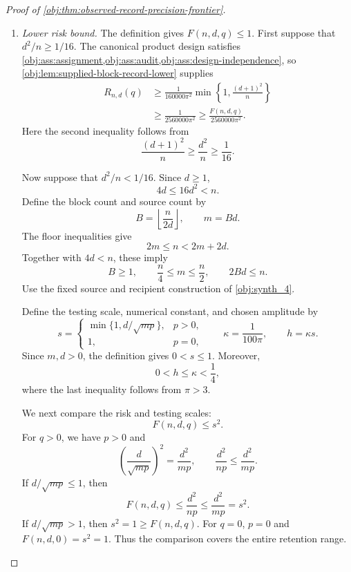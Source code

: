 \documentclass[11pt]{article}
\begin{document}
\begin{proof}[Proof of \cref{obj:thm:observed-record-precision-frontier}]
\begin{enumerate}
\item \textit{Lower risk bound.}
The definition gives \(F(n,d,q)\le1\). First suppose that
\(d^2/n\ge1/16\). The canonical product design satisfies
\cref{obj:ass:assignment,obj:ass:audit,obj:ass:design-independence}, so
\cref{obj:lem:supplied-block-record-lower} supplies
\[
\begin{aligned}
R_{n,d}(q)
&\ge\frac{1}{160000\pi^2}
       \min\left\{1,\frac{(d+1)^2}{n}\right\}\\
&\ge\frac{1}{2560000\pi^2}
\ge\frac{F(n,d,q)}{2560000\pi^2}.
\end{aligned}
\]
Here the second inequality follows from
\[
\frac{(d+1)^2}{n}\ge\frac{d^2}{n}\ge\frac1{16}.
\]

Now suppose that \(d^2/n<1/16\). Since \(d\ge1\),
\[
4d\le16d^2<n.
\]
Define the block count and source count by
\[
B=\left\lfloor\frac{n}{2d}\right\rfloor,
\qquad
m=Bd.
\]
The floor inequalities give
\[
2m\le n<2m+2d.
\]
Together with \(4d<n\), these imply
\[
B\ge1,
\qquad
\frac n4\le m\le\frac n2,
\qquad
2Bd\le n.
\]
Use the fixed source and recipient construction of \cref{obj:synth_4}.

Define the testing scale, numerical constant, and chosen amplitude by
\[
s=
\begin{cases}
\min\{1,d/\sqrt{mp}\},&p>0,\\
1,&p=0,
\end{cases}
\qquad
\kappa=\frac1{100\pi},
\qquad
h=\kappa s.
\]
Since \(m,d>0\), the definition gives \(0<s\le1\). Moreover,
\[
0<h\le\kappa<\frac14,
\]
where the last inequality follows from \(\pi>3\).

We next compare the risk and testing scales:
\[
F(n,d,q)\le s^2.
\]
For \(q>0\), we have \(p>0\) and
\[
\left(\frac d{\sqrt{mp}}\right)^2=\frac{d^2}{mp},
\qquad
\frac{d^2}{np}\le\frac{d^2}{mp}.
\]
If \(d/\sqrt{mp}\le1\), then
\[
F(n,d,q)\le\frac{d^2}{np}\le\frac{d^2}{mp}=s^2.
\]
If \(d/\sqrt{mp}>1\), then \(s^2=1\ge F(n,d,q)\).
For \(q=0\), \(p=0\) and \(F(n,d,0)=s^2=1\).
Thus the comparison covers the entire retention range.


\end{enumerate}
\end{proof}
\end{document}
